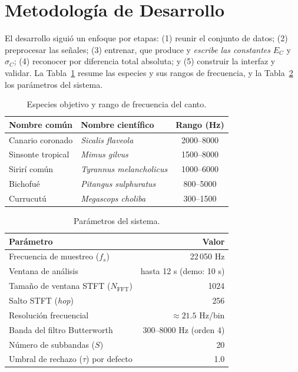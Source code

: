 \documentclass[conference]{IEEEtran}
\begin{document}
\section{Metodología de Desarrollo}\label{sec:metodologia}
El desarrollo siguió un enfoque por etapas: (1) reunir el conjunto de datos;
(2) preprocesar las señales; (3) entrenar, que produce y \emph{escribe las
constantes} $E_C$ y $\sigma_C$; (4) reconocer por diferencia total absoluta; y
(5) construir la interfaz y validar. La Tabla~\ref{tab:especies} resume las
especies y sus rangos de frecuencia, y la Tabla~\ref{tab:parametros} los
parámetros del sistema.

\begin{table}[!t]
\caption{Especies objetivo y rango de frecuencia del canto.}
\label{tab:especies}
\centering
\renewcommand{\arraystretch}{1.2}
\begin{tabularx}{\columnwidth}{@{}l l c@{}}
\toprule
\textbf{Nombre común} & \textbf{Nombre científico} & \textbf{Rango (Hz)} \\
\midrule
Canario coronado  & \textit{Sicalis flaveola}        & 2000--8000 \\
Sinsonte tropical & \textit{Mimus gilvus}            & 1500--8000 \\
Sirirí común      & \textit{Tyrannus melancholicus}  & 1000--6000 \\
Bichofué          & \textit{Pitangus sulphuratus}    & 800--5000  \\
Currucutú         & \textit{Megascops choliba}       & 300--1500  \\
\bottomrule
\end{tabularx}
\end{table}

\begin{table}[!t]
\caption{Parámetros del sistema.}
\label{tab:parametros}
\centering
\renewcommand{\arraystretch}{1.2}
\begin{tabularx}{\columnwidth}{@{}X r@{}}
\toprule
\textbf{Parámetro} & \textbf{Valor} \\
\midrule
Frecuencia de muestreo ($f_s$)            & 22\,050 Hz \\
Ventana de análisis                       & hasta 12 s (demo: 10 s) \\
Tamaño de ventana STFT ($N_{\text{FFT}}$) & 1024 \\
Salto STFT (\emph{hop})                   & 256 \\
Resolución frecuencial                    & $\approx 21.5$ Hz/bin \\
Banda del filtro Butterworth              & 300--8000 Hz (orden 4) \\
Número de subbandas ($S$)                 & 20 \\
Umbral de rechazo ($\tau$) por defecto    & 1.0 \\
\bottomrule
\end{tabularx}
\end{table}
\end{document}
